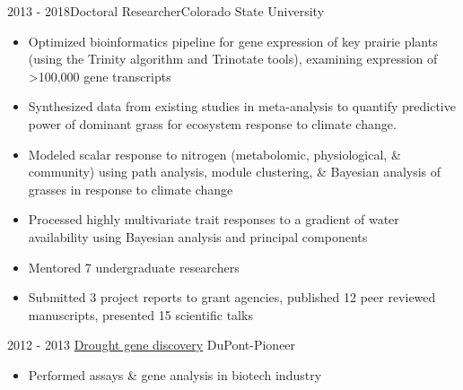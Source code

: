 \documentclass[letterpaper]{twentysecondcv} %
\begin{document}
\begin{twenty}
       \twentyitem
    	{2013 - }{2018}{Doctoral Researcher}{Colorado State University}
        	{}
        { \vspace{-2mm}
        {\begin{itemize}
        \item Optimized bioinformatics pipeline for gene expression of key prairie plants (using the Trinity algorithm and Trinotate tools), examining expression of >100,000 gene transcripts \vspace{0.4mm} 
        \item Synthesized data from existing studies in meta-analysis to quantify predictive power of dominant grass for ecosystem response to climate change. \vspace{0.4mm} 
        \item Modeled scalar response to nitrogen (metabolomic, physiological, \& community) using path analysis, module clustering, \& Bayesian analysis of grasses in response to climate change \vspace{0.4mm} 
       	\item Processed highly multivariate trait responses to a gradient of water availability using Bayesian analysis and principal components \vspace{0.4mm} 
	\item Mentored 7 undergraduate researchers \vspace{0.4mm} 
	\item Submitted 3 project reports to grant agencies, published 12 peer reviewed manuscripts, presented 15 scientific talks
    \end{itemize}}  \vspace{6mm}  }

\twentyitem
    	{2012 -}
		{2013}
        {\href{}{Drought gene discovery}}
        {DuPont-Pioneer}
        {}
        {
        \vspace{-2mm}
        {\begin{itemize}
        \item Performed assays \& gene analysis in biotech industry
    \end{itemize}}
        }
    \\   


                
\end{twenty}

\end{document}
